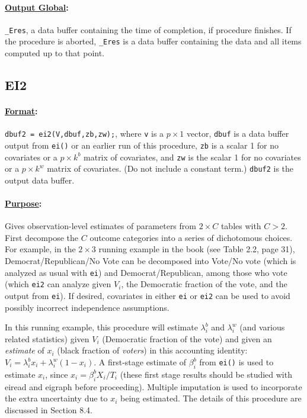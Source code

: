 \documentclass[11pt,titlepage]{article}
\begin{document}
\paragraph{\underline{Output Global}:}
\texttt{\_Eres}, a data buffer containing the time of completion, if
procedure finishes.  If the procedure is aborted, \texttt{\_Eres} is a
data buffer containing the data and all items computed up to that
point.

\subsection{EI2}

\paragraph{\underline{Format}:} \texttt{dbuf2 = ei2(V,dbuf,zb,zw);},
where \texttt{v} is a $p\times 1$ vector, \texttt{dbuf} is a data
buffer output from \texttt{ei()} or an earlier run of this procedure,
\texttt{zb} is a scalar 1 for no covariates or a $p\times k^b$ matrix
of covariates, and \texttt{zw} is the scalar 1 for no covariates or a
$p\times k^w$ matrix of covariates.  (Do not include a constant term.)
\texttt{dbuf2} is the output data buffer.

\paragraph{\underline{Purpose}:}
Gives observation-level estimates of parameters from $2\times C$
tables with $C>2$.  First decompose the $C$ outcome categories into a
series of dichotomous choices.  For example, in the $2\times 3$
running example in the book (see Table 2.2, page 31),
Democrat/Republican/No Vote can be decomposed into Vote/No vote (which
is analyzed as usual with \texttt{ei}) and Democrat/Republican, among
those who vote (which \texttt{ei2} can analyze given $V_i$, the
Democratic fraction of the vote, and the output from \texttt{ei}).  If
desired, covariates in either \texttt{ei} or \texttt{ei2} can be used
to avoid possibly incorrect independence assumptions.

In this running example, this procedure will estimate $\lambda^b_i$
and $\lambda_i^w$ (and various related statistics) given $V_i$
(Democratic fraction of the vote) and given an \emph{estimate} of
$x_i$ (black fraction of \emph{voters}) in this accounting identity:
$V_i = \lambda^b_ix_i + \lambda^w_i(1-x_i)$.  A first-stage estimate
of $\beta_i^b$ from \texttt{ei()} is used to estimate $x_i$, since
$x_i=\beta_i^bX_i/T_i$ (these first stage results should be studied
with eiread and eigraph before proceeding).  Multiple imputation is
used to incorporate the extra uncertainty due to $x_i$ being
estimated.  The details of this procedure are discussed in Section
8.4.
\end{document}
